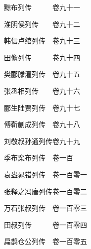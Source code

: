 \par\hspace{3.5em}黥布列传　　　\hspace{1.5em}卷九十一
\par\hspace{3.5em}淮阴侯列传　　\hspace{1.5em}卷九十二
\par\hspace{3.5em}韩信卢绾列传　\hspace{1.5em}卷九十三
\par\hspace{3.5em}田儋列传　　　\hspace{1.5em}卷九十四
\par\hspace{3.5em}樊郦滕灌列传　\hspace{1.5em}卷九十五
\par\hspace{3.5em}张丞相列传　　\hspace{1.5em}卷九十六
\par\hspace{3.5em}郦生陆贾列传　\hspace{1.5em}卷九十七
\par\hspace{3.5em}傅靳蒯成列传　\hspace{1.5em}卷九十八
\par\hspace{3.5em}刘敬叔孙通列传\hspace{1.5em}卷九十九
\par\hspace{3.5em}季布栾布列传　\hspace{1.5em}卷一百
\par\hspace{3.5em}袁盎晁错列传　\hspace{1.5em}卷一百零一
\par\hspace{3.5em}张释之冯唐列传\hspace{1.5em}卷一百零二
\par\hspace{3.5em}万石张叔列传　\hspace{1.5em}卷一百零三
\par\hspace{3.5em}田叔列传　　　\hspace{1.5em}卷一百零四
\par\hspace{3.5em}扁鹊仓公列传　\hspace{1.5em}卷一百零五
